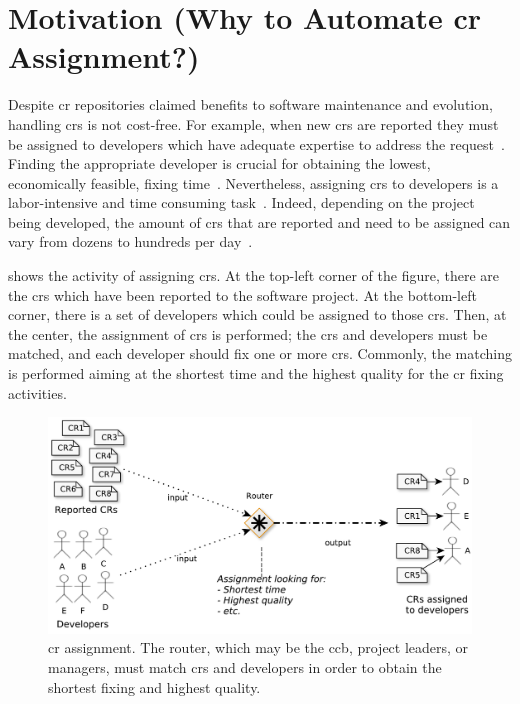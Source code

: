 \section[Motivation  (Why to Automate CR Assignment?)]{Motivation (Why to
Automate \ac{cr} Assignment?)}

Despite \ac{cr} repositories claimed benefits to software maintenance and
evolution, handling \acp{cr} is not cost-free. For example, when new \acp{cr}
are reported they must be assigned to developers which have adequate expertise
to address the request~\citep{Aljarah2011,Hosseini2012,Kagdi2012}. Finding the
appropriate developer is crucial for obtaining the lowest, economically
feasible, fixing time~\citep{Lucca2002}. Nevertheless, assigning \acp{cr} to
developers is a labor-intensive and time consuming
task~\citep{Anvik2006,Jeong2009}. Indeed, depending on the project being
developed, the amount of \acp{cr} that are reported and need to be assigned can
vary from dozens to hundreds per day~\citep{CavalcantiSQJ2011}.

 shows the activity of assigning \acp{cr}.
At the top-left corner of the figure, there are the \acp{cr} which have been
reported to the software project. At the bottom-left corner, there is a set of
developers which could be assigned to those \acp{cr}. Then, at the center, the
assignment of \acp{cr} is performed; the \acp{cr} and developers must be
matched, and each developer should fix one or more \acp{cr}. Commonly, the
matching is performed aiming at the shortest time and the highest quality for
the \ac{cr} fixing activities.

\begin{figure}[htp]
\centering
  \includegraphics[width=\columnwidth]{images/assignment-schema.pdf}
  \caption[\ac{cr} assignment.]{\ac{cr} assignment. The router, which may be the
  \acs{ccb}, project leaders, or managers, must match \acp{cr} and developers in
  order to obtain the shortest fixing and highest quality.}
  \label{fig:assignment-schema}
\end{figure}

